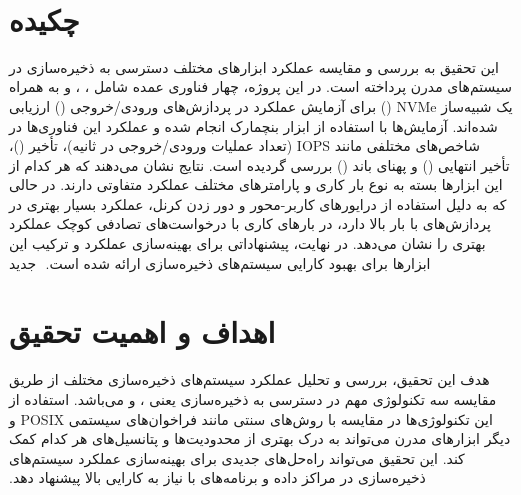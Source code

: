 ‫
‫%
‫%
‫%
‫
‫ %
‫ %
‫
‫\section{چکیده}
‫این تحقیق به بررسی و مقایسه عملکرد ابزارهای مختلف دسترسی به ذخیره‌سازی در سیستم‌های مدرن پرداخته است. در این پروژه، چهار فناوری عمده شامل ، ، و  به همراه یک شبیه‌ساز NVMe () برای آزمایش عملکرد در پردازش‌های ورودی/خروجی () ارزیابی شده‌اند. آزمایش‌ها با استفاده از ابزار بنچمارک  انجام شده و عملکرد این فناوری‌ها در شاخص‌های مختلفی مانند IOPS (تعداد عملیات ورودی/خروجی در ثانیه)، تأخیر ()، تأخیر انتهایی () و پهنای باند () بررسی گردیده است. نتایج نشان می‌دهند که هر کدام از این ابزارها بسته به نوع بار کاری و پارامترهای مختلف عملکرد متفاوتی دارند. در حالی که  به دلیل استفاده از درایورهای کاربر-محور و دور زدن کرنل، عملکرد بسیار بهتری در پردازش‌های با بار بالا دارد،  در بارهای کاری با درخواست‌های تصادفی کوچک عملکرد بهتری را نشان می‌دهد. در نهایت، پیشنهاداتی برای بهینه‌سازی عملکرد و ترکیب این ابزارها برای بهبود کارایی سیستم‌های ذخیره‌سازی ارائه شده است.
‫
‫‌جدید
‫
‫\section*{اهداف و اهمیت تحقیق}
‫هدف این تحقیق، بررسی و تحلیل عملکرد سیستم‌های ذخیره‌سازی مختلف از طریق مقایسه سه تکنولوژی مهم در دسترسی به ذخیره‌سازی یعنی ،  و  می‌باشد. استفاده از این تکنولوژی‌ها در مقایسه با روش‌های سنتی مانند فراخوان‌های سیستمی POSIX و دیگر ابزارهای مدرن می‌تواند به درک بهتری از محدودیت‌ها و پتانسیل‌های هر کدام کمک کند. این تحقیق می‌تواند راه‌حل‌های جدیدی برای بهینه‌سازی عملکرد سیستم‌های ذخیره‌سازی در مراکز داده و برنامه‌های با نیاز به کارایی بالا پیشنهاد دهد.
